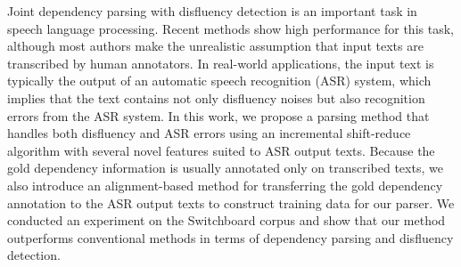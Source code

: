 Joint dependency parsing with disfluency detection is an important task in speech language processing. Recent methods show high performance for this task, although most authors make the unrealistic assumption that input texts are transcribed by human annotators. In real-world applications, the input text is typically the output of an automatic speech recognition (ASR) system, which implies that the text contains not only disfluency noises but also recognition errors from the ASR system. In this work, we propose a parsing method that handles both disfluency and ASR errors using an incremental shift-reduce algorithm with several novel features suited to ASR output texts. Because the gold dependency information is usually annotated only on transcribed texts, we also introduce an alignment-based method for transferring the gold dependency annotation to the ASR output texts to construct training data for our parser. We conducted an experiment on the Switchboard corpus and show that our method outperforms conventional methods in terms of dependency parsing and disfluency detection.

